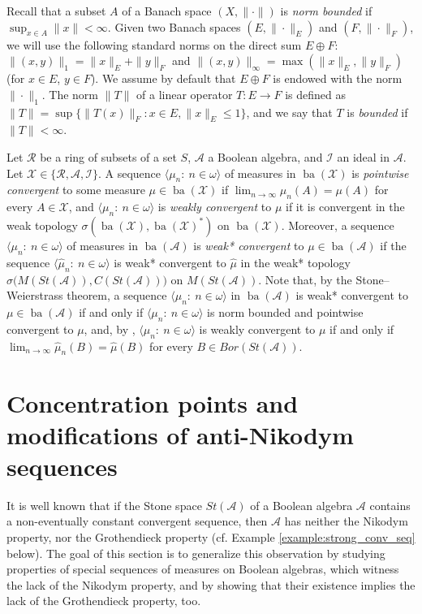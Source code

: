 \documentclass[a4paper,11pt,fleqn]{amsart}
\theoremstyle{definition}
\theoremstyle{remark}
\numberwithin{equation}{section}
\newcommand{\N}{\mathbb{N}}
\newcommand{\aA}{\mathcal{A}}
\newcommand{\iI}{\mathcal{I}}
\newcommand{\rR}{\mathcal{R}}
\newcommand{\xX}{\mathcal{X}}
\DeclareMathOperator{\ba}{ba}
\newcommand{\wh}{\widehat}
\newcommand{\seqn}[1]{\big\langle#1\colon\ n\io\big\rangle}
\newcommand{\io}{\in\omega}%
\begin{document}
\medskip

Recall that a subset $A$ of a Banach space $(X,\|\cdot\|)$ is \textit{norm bounded} if $\sup_{x\in A}\|x\|<\infty$. Given two Banach spaces $(E,\|\cdot\|_E)$ and $(F,\|\cdot\|_F)$, we will use the following standard norms on the direct sum $E\oplus F$: $\|(x,y)\|_1=\|x\|_E+\|y\|_F$ and $\|(x,y)\|_\infty=\max(\|x\|_E,\|y\|_F)$ (for $x\in E$, $y\in F$). We assume by default that $E\oplus F$ is endowed with the norm $\|\cdot\|_1$. The norm $\|T\|$ of a linear operator $T\colon E\to F$ is defined as $\|T\|=\sup\big\{\|T(x)\|_F\colon x\in E, \|x\|_E\le 1\big\}$, and we say that $T$ is \textit{bounded} if $\|T\|<\infty$.

\medskip

Let $\rR$ be a ring of subsets of a set $S$, $\aA$ a Boolean algebra, and $\iI$ an ideal in $\aA$. Let $\xX\in\{\rR,\aA,\iI\}$. A sequence $\seqn{\mu_n}$ of measures in $\ba(\xX)$ is \textit{pointwise convergent} to some measure $\mu\in\ba(\xX)$ if $\lim_{n\to\infty}\mu_n(A)=\mu(A)$ for every $A\in\xX$, and $\seqn{\mu_n}$ is \textit{weakly convergent} to $\mu$ if it is convergent in the weak topology $\sigma(\ba(\xX),\ba(\xX)^*)$ on $\ba(\xX)$. Moreover, a sequence $\seqn{\mu_n}$ of measures in $\ba(\aA)$ is \textit{weak* convergent} to $\mu\in\ba(\aA)$ if the sequence $\seqn{\wh{\mu}_n}$ is weak* convergent to $\wh{\mu}$ in the weak* topology $\sigma\big(M(St(\aA)),C(St(\aA))\big)$ on $M(St(\aA))$. Note that, by the Stone--Weierstrass theorem, a sequence $\seqn{\mu_n}$ in $\ba(\aA)$ is weak* convergent to $\mu\in\ba(\aA)$ if and only if $\seqn{\mu_n}$ is norm bounded and pointwise convergent to $\mu$, and, by \cite[Theorem 11, page 90]{Die84}, $\seqn{\mu_n}$ is weakly convergent to $\mu$ if and only if $\lim_{n\to\infty}\wh{\mu}_n(B)=\wh{\mu}(B)$ for every $B\in Bor(St(\aA))$.

\section{Concentration points and modifications of anti-Nikodym sequences\label{sec:anti}}

It is well known that if the Stone space $St(\aA)$ of a Boolean algebra $\aA$ contains a non-eventually constant convergent sequence, then $\aA$ has neither the Nikodym property, nor the Grothendieck property (cf. Example \ref{example:strong_conv_seq} below). The goal of this section is to generalize this observation by studying properties of special sequences of measures on Boolean algebras, which witness the lack of the Nikodym property, and by showing that their existence implies the lack of the Grothendieck property, too.
\end{document}
